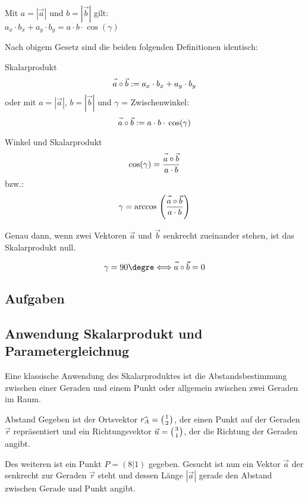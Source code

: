 \begin{gesetz}{}{}
  Mit $a = |\vec{a}|$ und $b = |\vec{b}|$ gilt:\\
  $a_x\cdot{}b_x + a_y\cdot{}b_y = a\cdot{}b\cdot{}\cos(\gamma)$
\end{gesetz}
  \newpage

Nach obigem Gesetz sind die beiden folgenden Definitionen identisch:
\begin{definition}{Skalarprodukt}{}
  $$\vec{a\vphantom{b}}\circ\vec{b} := a_x\cdot{}b_x + a_y \cdot{} b_y$$
oder mit $a=|\vec{a}|$, $b=|\vec{b}|$ und $\gamma$ = Zwischenwinkel:
  $$\vec{a\vphantom{b}}\circ\vec{b} := a\cdot{}b\cdot{}\cos({\gamma})$$
\end{definition}


\begin{gesetz}{Winkel und Skalarprodukt}{}
  $$\cos(\gamma) = \frac{\vec{a\vphantom{b}}\circ\vec{b}}{a\cdot b}$$
  bzw.:
  $$\gamma = \arccos{} \left(\frac{\vec{a\vphantom{b}}\circ\vec{b}}{a\cdot b}\right)$$
  
\end{gesetz}

\begin{bemerkung}{}{}
  Genau dann, wenn zwei Vektoren $\vec{a}$ und $\vec{b}$ senkrecht
  zueinander stehen, ist das Skalarprodukt null.

  $$\gamma=90\degre   \Longleftrightarrow  \vec{a\vphantom{b}}\circ\vec{b}=0$$
  \end{bemerkung}


\subsection*{Aufgaben}

\newpage
\subsection{Anwendung Skalarprodukt und Parametergleichnug}

Eine klassische Anwendung des Skalarproduktes ist die
Abstandsbestimmung zwischen einer Geraden und einem Punkt oder
allgemein zwischen zwei Geraden im Raum.

\begin{beispiel}{Abstand}{}
Gegeben ist der Ortsvektor $\vec{r_A}=\left(1 \atop 2\right)$, der einen Punkt auf der
Geraden $\vec{r}$ repräsentiert und ein Richtungsvektor
$\vec{u}=\left(3\atop 1\right)$, der
die Richtung der Geraden angibt.

Des weiteren ist ein Punkt $P=(8|1)$ gegeben. Gesucht ist nun ein Vektor
$\vec{a}$ der senkrecht zur Geraden $\vec{r}$ steht und dessen Länge
$|\vec{a}|$ gerade den Abstand zwischen Gerade und Punkt angibt.
\end{beispiel}
